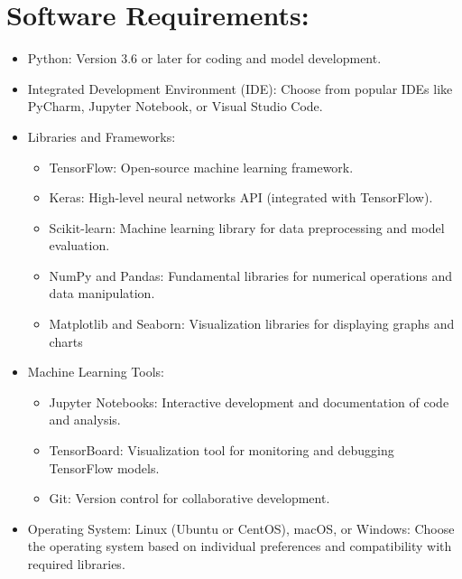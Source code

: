 \documentclass[ 12pt,a4paper,twocolumn,fleqn]{report}
\begin{document}
\section{Software Requirements:}
\vspace{2mm}
\begin{itemize}
    \item Python: Version 3.6 or later for coding and model development.
\item Integrated Development Environment (IDE): Choose from popular IDEs like PyCharm, Jupyter
Notebook, or Visual Studio Code.
\item Libraries and Frameworks:
\begin{itemize}
    \item TensorFlow: Open-source machine learning framework.
\item Keras: High-level neural networks API (integrated with TensorFlow).
\item Scikit-learn: Machine learning library for data preprocessing and model evaluation.
\item NumPy and Pandas: Fundamental libraries for numerical operations and data
manipulation.
\item Matplotlib and Seaborn: Visualization libraries for displaying graphs and charts
\end{itemize}
\item Machine Learning Tools:
\begin{itemize}
    \item Jupyter Notebooks: Interactive development and documentation of code and analysis.
\item TensorBoard: Visualization tool for monitoring and debugging TensorFlow models.
\item Git: Version control for collaborative development.
\end{itemize}
\item Operating System: Linux (Ubuntu or CentOS), macOS, or Windows: Choose the operating
system based on individual preferences and compatibility with required libraries.
\end{itemize}

\newpage
  \pagestyle{fancy}
\thisfancypage{%
  \setlength{\fboxsep}{20pt}\doublebox}{}
\normalsize
\end{document}
